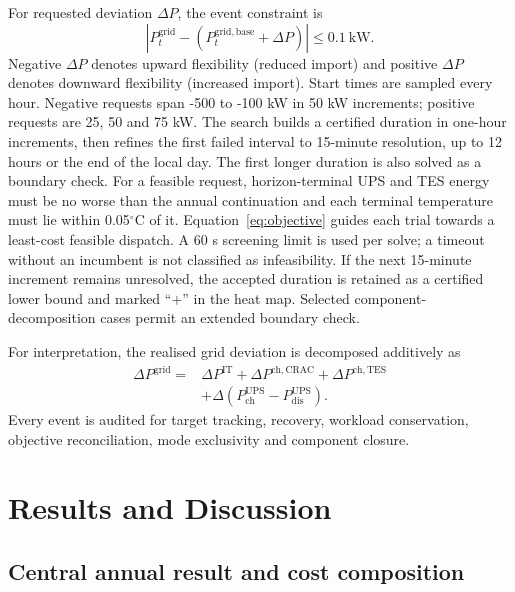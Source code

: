 For requested deviation $\Delta P$, the event constraint is
\begin{equation}
 \left|P^{\mathrm{grid}}_t-
 (P^{\mathrm{grid,base}}_t+\Delta P)\right|\leq0.1\ \mathrm{kW}.
 \label{eq:flex-target}
\end{equation}
Negative $\Delta P$ denotes upward flexibility (reduced import) and positive
$\Delta P$ denotes downward flexibility (increased import). Start times are
sampled every hour. Negative requests span -500 to -100 kW in 50 kW increments;
positive requests are 25, 50 and 75 kW. The search
builds a certified duration in one-hour increments, then refines the first
failed interval to 15-minute resolution, up to 12 hours or the end of the local
day. The first longer duration is also solved as a boundary check.
For a feasible request, horizon-terminal UPS and TES energy must be no worse
than the annual continuation and each terminal temperature must lie within
0.05$^{\circ}$C of it. Equation~\eqref{eq:objective} guides each trial towards
a least-cost feasible dispatch. A 60 s screening limit is used per solve; a
timeout without an incumbent is not classified as infeasibility. If the next
15-minute increment remains unresolved, the accepted duration is retained as
a certified lower bound and marked ``+'' in the heat map. Selected
component-decomposition cases permit an extended boundary check.

For interpretation, the realised grid deviation is decomposed additively as
\begin{equation}
 \begin{split}
 \Delta P^{\mathrm{grid}}={}&\Delta P^{\mathrm{IT}}+
 \Delta P^{\mathrm{ch,CRAC}}+\Delta P^{\mathrm{ch,TES}}\\
 &+\Delta(P^{\mathrm{UPS}}_{\mathrm{ch}}-P^{\mathrm{UPS}}_{\mathrm{dis}}).
 \end{split}
 \label{eq:component-decomposition}
\end{equation}
Every event is audited for target tracking, recovery, workload conservation,
objective reconciliation, mode exclusivity and component closure.

\section{Results and Discussion}\label{sec:results}

\subsection{Central annual result and cost composition}

